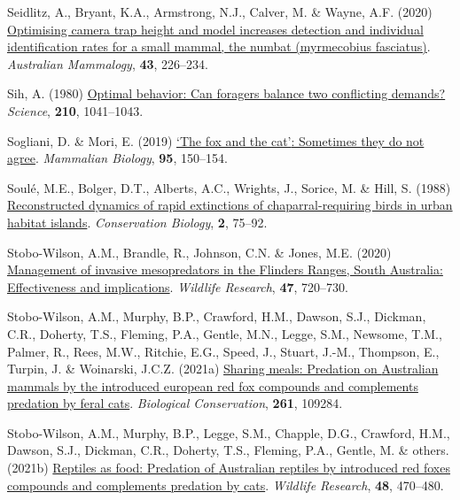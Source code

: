\documentclass[preprint, 3p, authoryear]{elsarticle} %
\newlength{\cslhangindent}
\newlength{\cslentryspacingunit} %
\newenvironment{CSLReferences}[2] %
 {%
  \setlength{\parindent}{0pt}
  \ifodd #1
  \let\oldpar\par
  \def\par{\hangindent=\cslhangindent\oldpar}
  \fi
  \setlength{\parskip}{#2\cslentryspacingunit}
 }%
 {}
\begin{document}
\begin{CSLReferences}{1}{0}
\leavevmode{}%
Seidlitz, A., Bryant, K.A., Armstrong, N.J., Calver, M. \& Wayne, A.F. (2020) \href{https://doi.org/10.1071/AM20020}{Optimising camera trap height and model increases detection and individual identification rates for a small mammal, the numbat (myrmecobius fasciatus)}. \emph{Australian Mammalogy}, \textbf{43}, 226--234.

\leavevmode{}%
Sih, A. (1980) \href{https://doi.org/10.1126/science.210.4473.1041}{Optimal behavior: Can foragers balance two conflicting demands?} \emph{Science}, \textbf{210}, 1041--1043.

\leavevmode{}%
Sogliani, D. \& Mori, E. (2019) \href{https://doi.org/10.1016/j.mambio.2018.07.003}{{`The fox and the cat'}: Sometimes they do not agree}. \emph{Mammalian Biology}, \textbf{95}, 150--154.

\leavevmode{}%
Soulé, M.E., Bolger, D.T., Alberts, A.C., Wrights, J., Sorice, M. \& Hill, S. (1988) \href{https://doi.org/10.1111/j.1523-1739.1988.tb00337.x}{Reconstructed dynamics of rapid extinctions of chaparral-requiring birds in urban habitat islands}. \emph{Conservation Biology}, \textbf{2}, 75--92.

\leavevmode{}%
Stobo-Wilson, A.M., Brandle, R., Johnson, C.N. \& Jones, M.E. (2020) \href{https://doi.org/10.1071/WR19237}{Management of invasive mesopredators in the {Flinders Ranges, South {A}ustralia}: Effectiveness and implications}. \emph{Wildlife Research}, \textbf{47}, 720--730.

\leavevmode{}%
Stobo-Wilson, A.M., Murphy, B.P., Crawford, H.M., Dawson, S.J., Dickman, C.R., Doherty, T.S., Fleming, P.A., Gentle, M.N., Legge, S.M., Newsome, T.M., Palmer, R., Rees, M.W., Ritchie, E.G., Speed, J., Stuart, J.-M., Thompson, E., Turpin, J. \& Woinarski, J.C.Z. (2021a) \href{https://doi.org/10.1016/j.biocon.2021.109284}{Sharing meals: Predation on {{A}ustralian} mammals by the introduced european red fox compounds and complements predation by feral cats}. \emph{Biological Conservation}, \textbf{261}, 109284.

\leavevmode{}%
Stobo-Wilson, A.M., Murphy, B.P., Legge, S.M., Chapple, D.G., Crawford, H.M., Dawson, S.J., Dickman, C.R., Doherty, T.S., Fleming, P.A., Gentle, M. \& others. (2021b) \href{https://doi.org/10.1071/WR20194}{Reptiles as food: Predation of {{A}ustralian} reptiles by introduced red foxes compounds and complements predation by cats}. \emph{Wildlife Research}, \textbf{48}, 470--480.


\end{CSLReferences}
\end{document}
